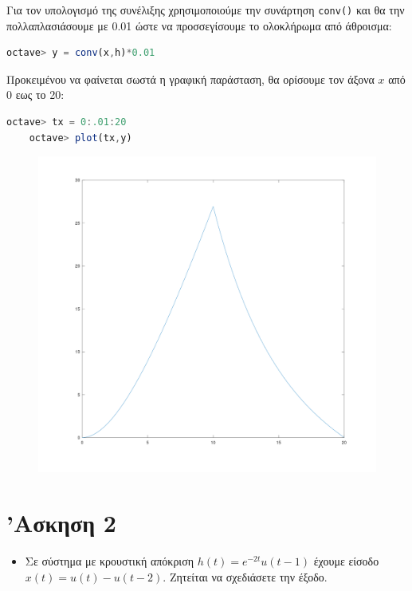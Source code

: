 \documentclass{article}
\begin{document}
Για τον υπολογισμό της συνέλιξης χρησιμοποιούμε την συνάρτηση \lstinline{conv()}
και θα την πολλαπλασιάσουμε με 0.01 ώστε να προσσεγίσουμε το ολοκλήρωμα από
άθροισμα:

\begin{lstlisting}[language=octave]
	octave> y = conv(x,h)*0.01
\end{lstlisting}

Προκειμένου να φαίνεται σωστά η γραφική παράσταση, θα ορίσουμε τον άξονα $x$
από 0 εως το 20:

\begin{lstlisting}[language=octave]
	octave> tx = 0:.01:20
	octave> plot(tx,y)
\end{lstlisting}

\begin{figure}[H]
        \centering
        \includegraphics[width=\linewidth]{res/fig1.png}
\end{figure}

\section{'Ασκηση 2}

\begin{itemize}
	\item Σε σύστημα με κρουστική απόκριση $h(t) = e^{-2t}u(t - 1)$ έχουμε
		είσοδο $x(t) = u(t) - u(t - 2)$. Ζητείται να σχεδιάσετε
		την έξοδο.
\end{itemize}
\end{document}

